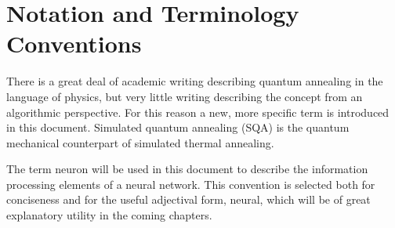 \documentclass[11pt]{afthesis}
\begin{document}







\section{Notation and Terminology Conventions}

There is a great deal of academic writing describing quantum annealing in the language of physics, but very little writing describing the concept from an algorithmic perspective. For this reason a new, more specific term is introduced in this document. Simulated quantum annealing (SQA) is the quantum mechanical counterpart of simulated thermal annealing. 


The term neuron will be used in this document to describe the information processing elements of a neural network. This convention is selected both for conciseness and for the useful adjectival form, neural, which will be of great explanatory utility in the coming chapters.
\end{document}
